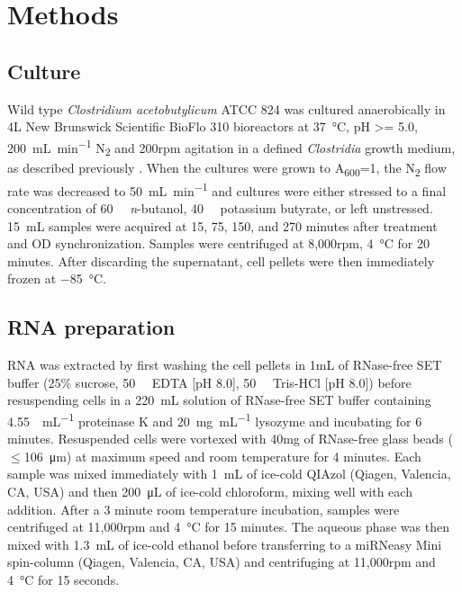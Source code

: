
\chapter{Methods}


\section{Culture}
Wild type \textit{Clostridium acetobutylicum} ATCC 824 was cultured anaerobically in 4L New Brunswick Scientific BioFlo 310 bioreactors at \SI{37}{\degreeCelsius}, pH >= 5.0, \SI{200}{\milli\liter\per\minute} N\textsubscript{2} and 200rpm agitation in a defined \textit{Clostridia} growth medium, as described previously \cite{39}. When the cultures were grown to A\textsubscript{600}=1, the N\textsubscript{2} flow rate was decreased to \SI{50}{\milli\liter\per\minute} and cultures were either stressed to a final concentration of \SI{60}{\milli\Molar} \textit{n}-butanol, \SI{40}{\milli\Molar} potassium butyrate, or left unstressed. \SI{15}{\milli\liter} samples were acquired at 15, 75, 150, and 270 minutes after treatment and OD synchronization. Samples were centrifuged at 8,000rpm, \SI{4}{\degreeCelsius} for 20 minutes. After discarding the supernatant, cell pellets were then immediately frozen at \SI{-85}{\degreeCelsius}.

\section{RNA preparation}
\label{methods:RNA_prep}
RNA was extracted by first washing the cell pellets in 1mL of RNase-free SET buffer (25\% sucrose, \SI{50}{\milli\Molar} EDTA [pH 8.0], \SI{50}{\milli\Molar} Tris-HCl [pH 8.0]) before resuspending cells in a \SI{220}{\milli\liter} solution of RNase-free SET buffer containing \SI{4.55}{\Units\per\milli\liter} proteinase K and \SI{20}{\milli\gram\per\milli\liter} lysozyme and incubating for 6 minutes. Resuspended cells were vortexed with 40mg of RNase-free glass beads ($\leq$\SI{106}{\micro\metre}) at maximum speed and room temperature for 4 minutes. Each sample was mixed immediately with \SI{1}{\milli\liter} of ice-cold QIAzol (Qiagen, Valencia, CA, USA) and then \SI{200}{\micro\liter} of ice-cold chloroform, mixing well with each addition. After a 3 minute room temperature incubation, samples were centrifuged at 11,000rpm and \SI{4}{\degreeCelsius} for 15 minutes. The aqueous phase was then mixed with \SI{1.3}{\milli\liter} of ice-cold ethanol before transferring to a miRNeasy Mini spin-column (Qiagen, Valencia, CA, USA) and centrifuging at 11,000rpm and \SI{4}{\degreeCelsius} for 15 seconds.

